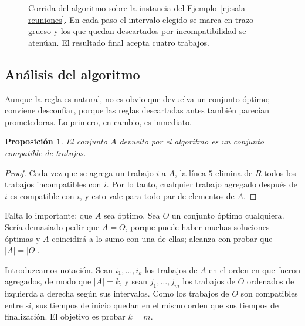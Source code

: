 \documentclass[12pt, spanish, oneside, openany]{book}
\theoremstyle{uprightplain}
\newtheorem{proposicion}[teorema]{Proposición}
\theoremstyle{definition}
\theoremstyle{remark}
\theoremstyle{definition}
\begin{document}
\begin{figure}[H]
\caption{Corrida del algoritmo sobre la instancia del
Ejemplo~\ref{ej:sala-reuniones}. En cada paso el intervalo elegido se marca en
trazo grueso y los que quedan descartados por incompatibilidad se atenúan. El
resultado final acepta cuatro trabajos.}
\label{fig:corrida-intervalos}
\end{figure}

\subsection{Análisis del algoritmo}

Aunque la regla es natural, no es obvio que devuelva un conjunto óptimo; conviene desconfiar, porque las reglas descartadas antes también parecían prometedoras. Lo primero, en cambio, es inmediato.

\begin{proposicion}
\label{prop:A-compatible}
El conjunto $A$ devuelto por el algoritmo es un conjunto compatible de trabajos.
\end{proposicion}
\begin{proof}
Cada vez que se agrega un trabajo $i$ a $A$, la línea $5$ elimina de $R$ todos los trabajos incompatibles con $i$. Por lo tanto, cualquier trabajo agregado después de $i$ es compatible con $i$, y esto vale para todo par de elementos de $A$.
\end{proof}

Falta lo importante: que $A$ sea óptimo. Sea $O$ un conjunto óptimo cualquiera. Sería demasiado pedir que $A=O$, porque puede haber muchas soluciones óptimas y $A$ coincidirá a lo sumo con una de ellas; alcanza con probar que $|A|=|O|$.

Introduzcamos notación. Sean $i_1,\dots,i_k$ los trabajos de $A$ en el orden en que fueron agregados, de modo que $|A|=k$, y sean $j_1,\dots,j_m$ los trabajos de $O$ ordenados de izquierda a derecha según sus intervalos. Como los trabajos de $O$ son compatibles entre sí, sus tiempos de inicio quedan en el mismo orden que sus tiempos de finalización. El objetivo es probar $k=m$.
\end{document}
